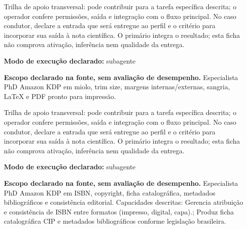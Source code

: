 \begin{funcao}
Trilha de apoio transversal: pode contribuir para a tarefa específica descrita; o operador confere permissões, saída e integração com o fluxo principal. No caso condutor, declare a entrada que será entregue ao perfil e o critério para incorporar sua saída à nota científica. O primário integra o resultado; esta ficha não comprova ativação, inferência nem qualidade da entrega.
\end{funcao}

\begin{arquitetura}
\textbf{Modo de execução declarado:} subagente
\end{arquitetura}


\begin{descricao}
\textbf{Escopo declarado na fonte, sem avaliação de desempenho.}
Especialista PhD Amazon KDP em miolo, trim size, margens internas/externas, sangria, LaTeX e PDF pronto para impressão.
\end{descricao}

\begin{funcao}
Trilha de apoio transversal: pode contribuir para a tarefa específica descrita; o operador confere permissões, saída e integração com o fluxo principal. No caso condutor, declare a entrada que será entregue ao perfil e o critério para incorporar sua saída à nota científica. O primário integra o resultado; esta ficha não comprova ativação, inferência nem qualidade da entrega.
\end{funcao}

\begin{arquitetura}
\textbf{Modo de execução declarado:} subagente
\end{arquitetura}


\begin{descricao}
\textbf{Escopo declarado na fonte, sem avaliação de desempenho.}
Especialista PhD Amazon KDP em ISBN, copyright, ficha catalográfica, metadados bibliográficos e consistência editorial. Capacidades descritas: Gerencia atribuição e consistência de ISBN entre formatos (impresso, digital, capa).; Produz ficha catalográfica CIP e metadados bibliográficos conforme legislação brasileira.
\end{descricao}

